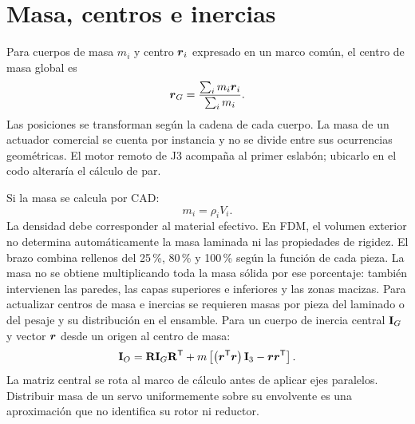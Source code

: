 \section{Masa, centros e inercias}
Para cuerpos de masa $m_i$ y centro $\boldsymbol{r}_i$ expresado en un marco común, el centro de masa global es
\begin{equation}
\boldsymbol{r}_G=\frac{\sum_i m_i\boldsymbol{r}_i}{\sum_i m_i}.
\label{eq:cg}
\end{equation}
Las posiciones se transforman según la cadena de cada cuerpo. La masa de un actuador comercial se cuenta por instancia y no se divide entre sus ocurrencias geométricas. El motor remoto de J3 acompaña al primer eslabón; ubicarlo en el codo alteraría el cálculo de par.

Si la masa se calcula por CAD:
\begin{equation}
m_i=\rho_iV_i.
\end{equation}
La densidad debe corresponder al material efectivo. En FDM, el volumen exterior no determina automáticamente la masa laminada ni las propiedades de rigidez. El brazo combina rellenos del 25\,\%, 80\,\% y 100\,\% según la función de cada pieza. La masa no se obtiene multiplicando toda la masa sólida por ese porcentaje: también intervienen las paredes, las capas superiores e inferiores y las zonas macizas. Para actualizar centros de masa e inercias se requieren masas por pieza del laminado o del pesaje y su distribución en el ensamble. Para un cuerpo de inercia central $\mathbf{I}_G$ y vector $\boldsymbol{r}$ desde un origen al centro de masa:
\begin{equation}
\mathbf{I}_O=\mathbf{R}\mathbf{I}_G\mathbf{R}^{\mathsf{T}}
+m\left[\left(\boldsymbol{r}^{\mathsf{T}}\boldsymbol{r}\right)\mathbf{I}_3-\boldsymbol{r}\boldsymbol{r}^{\mathsf{T}}\right].
\end{equation}
La matriz central se rota al marco de cálculo antes de aplicar ejes paralelos. Distribuir masa de un servo uniformemente sobre su envolvente es una aproximación que no identifica su rotor ni reductor.


